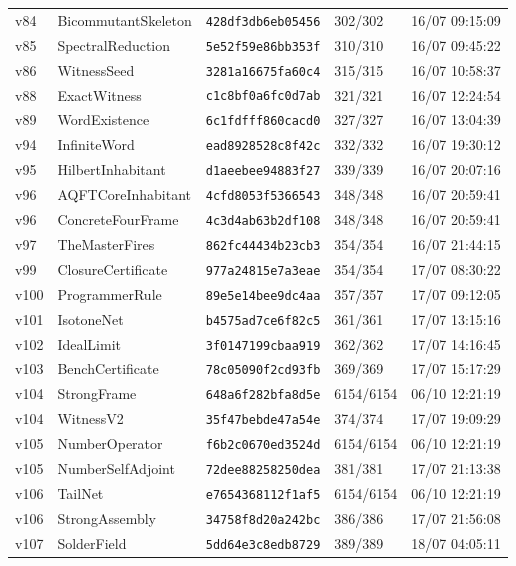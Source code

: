 \documentclass[11pt]{article}
\theoremstyle{definition}\newtheorem{deriv}{Derivation}
\begin{document}
{\begin{longtable}{@{}lllll@{}}
v84 & BicommutantSkeleton & \texttt{428df3db6eb05456} & 302/302 & 16/07 09:15:09 \\
v85 & SpectralReduction & \texttt{5e52f59e86bb353f} & 310/310 & 16/07 09:45:22 \\
v86 & WitnessSeed & \texttt{3281a16675fa60c4} & 315/315 & 16/07 10:58:37 \\
v88 & ExactWitness & \texttt{c1c8bf0a6fc0d7ab} & 321/321 & 16/07 12:24:54 \\
v89 & WordExistence & \texttt{6c1fdfff860cacd0} & 327/327 & 16/07 13:04:39 \\
v94 & InfiniteWord & \texttt{ead8928528c8f42c} & 332/332 & 16/07 19:30:12 \\
v95 & HilbertInhabitant & \texttt{d1aeebee94883f27} & 339/339 & 16/07 20:07:16 \\
v96 & AQFTCoreInhabitant & \texttt{4cfd8053f5366543} & 348/348 & 16/07 20:59:41 \\
v96 & ConcreteFourFrame & \texttt{4c3d4ab63b2df108} & 348/348 & 16/07 20:59:41 \\
v97 & TheMasterFires & \texttt{862fc44434b23cb3} & 354/354 & 16/07 21:44:15 \\
v99 & ClosureCertificate & \texttt{977a24815e7a3eae} & 354/354 & 17/07 08:30:22 \\
v100 & ProgrammerRule & \texttt{89e5e14bee9dc4aa} & 357/357 & 17/07 09:12:05 \\
v101 & IsotoneNet & \texttt{b4575ad7ce6f82c5} & 361/361 & 17/07 13:15:16 \\
v102 & IdealLimit & \texttt{3f0147199cbaa919} & 362/362 & 17/07 14:16:45 \\
v103 & BenchCertificate & \texttt{78c05090f2cd93fb} & 369/369 & 17/07 15:17:29 \\
v104 & StrongFrame & \texttt{648a6f282bfa8d5e} & 6154/6154 & 06/10 12:21:19 \\
v104 & WitnessV2 & \texttt{35f47bebde47a54e} & 374/374 & 17/07 19:09:29 \\
v105 & NumberOperator & \texttt{f6b2c0670ed3524d} & 6154/6154 & 06/10 12:21:19 \\
v105 & NumberSelfAdjoint & \texttt{72dee88258250dea} & 381/381 & 17/07 21:13:38 \\
v106 & TailNet & \texttt{e7654368112f1af5} & 6154/6154 & 06/10 12:21:19 \\
v106 & StrongAssembly & \texttt{34758f8d20a242bc} & 386/386 & 17/07 21:56:08 \\
v107 & SolderField & \texttt{5dd64e3c8edb8729} & 389/389 & 18/07 04:05:11 \\

\end{longtable}}
\end{document}
